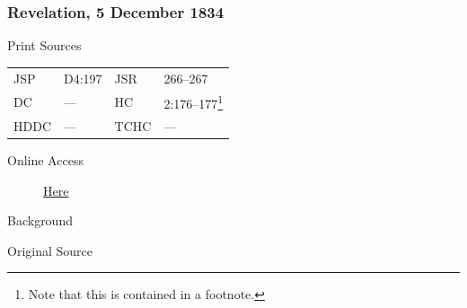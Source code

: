 		\subsubsection{Revelation, 5 December 1834}
			\label{EMS-1834-JS-5-DEC-1834}
			
			\begin{description}
					\item[Print Sources]
				\end{description}

					\begin{tabular}{p{0.5in}p{1in}p{0.5in}p{1in}}
					JSP	 	& D4:197			& JSR 		& 266--267 \\
					DC	 	& --- 				& HC 		& 2:176--177\footnote{Note that this is contained in a footnote.} \\
					HDDC 	& ---				& TCHC 		& --- \\
					\end{tabular}
				
				\begin{description}
					\item[Online Access] \href{https://www.josephsmithpapers.org/paper-summary/revelation-5-december-1834/1}{Here}
				\end{description}
				
				\begin{description}
					\item[Background]
				\end{description}
				
				
				\begin{description}
					\item[Original Source]
				\end{description}
				
				
